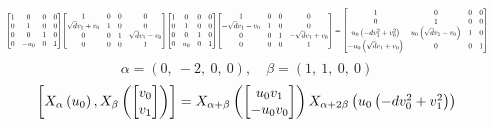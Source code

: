 \documentclass[11pt]{article}
\theoremstyle{definition}
\begin{document}
\[
\scaletoalign{\textwidth}{{\left[\begin{matrix}1 & 0 & 0 & 0\\0 & 1 & 0 & 0\\0 & 0 & 1 & 0\\0 & - u_{0} & 0 & 1\end{matrix}\right]} {\left[\begin{matrix}1 & 0 & 0 & 0\\\sqrt{d} v_{1} + v_{0} & 1 & 0 & 0\\0 & 0 & 1 & \sqrt{d} v_{1} - v_{0}\\0 & 0 & 0 & 1\end{matrix}\right]} {\left[\begin{matrix}1 & 0 & 0 & 0\\0 & 1 & 0 & 0\\0 & 0 & 1 & 0\\0 & u_{0} & 0 & 1\end{matrix}\right]} {\left[\begin{matrix}1 & 0 & 0 & 0\\- \sqrt{d} v_{1} - v_{0} & 1 & 0 & 0\\0 & 0 & 1 & - \sqrt{d} v_{1} + v_{0}\\0 & 0 & 0 & 1\end{matrix}\right]} = {\left[\begin{matrix}1 & 0 & 0 & 0\\0 & 1 & 0 & 0\\u_{0} \left(- d v_{1}^{2} + v_{0}^{2}\right) & u_{0} \left(\sqrt{d} v_{1} - v_{0}\right) & 1 & 0\\- u_{0} \left(\sqrt{d} v_{1} + v_{0}\right) & 0 & 0 & 1\end{matrix}\right]}}
\]
\[
\alpha = \left( 0, \  -2, \  0, \  0\right), \quad \beta = \left( 1, \  1, \  0, \  0\right)
\]
\[
\scaletoalign{\textwidth}{\left[ X_{\alpha}\left(u_{0}\right), X_{\beta}\left(\left[\begin{matrix}v_{0}\\v_{1}\end{matrix}\right]\right) \right] = X_{\alpha + \beta}\left(\left[\begin{matrix}u_{0} v_{1}\\- u_{0} v_{0}\end{matrix}\right]\right) X_{\alpha + 2\beta}\left(u_{0} \left(- d v_{0}^{2} + v_{1}^{2}\right)\right)}
\]
\end{document}
